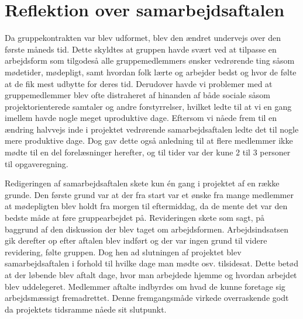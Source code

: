 \section{Reflektion over samarbejdsaftalen}\label{Reflektion-over-samarbejdsaftale}
Da gruppekontrakten var blev udformet, blev den ændret undervejs over den første måneds tid. Dette skyldtes at gruppen havde svært ved at tilpasse en arbejdsform som tilgodeså alle gruppemedlemmers ønsker vedrørende ting såsom mødetider, mødepligt, samt hvordan folk lærte og arbejder bedst og hvor de følte at de fik mest udbytte for deres tid. Derudover havde vi problemer med at gruppemedlemmer blev ofte distraheret af hinanden af både sociale såsom projektorienterede samtaler og andre forstyrrelser, hvilket ledte til at vi en gang imellem havde nogle meget uproduktive dage. Eftersom vi nåede frem til en ændring halvvejs inde i projektet vedrørende samarbejdsaftalen ledte det til nogle mere produktive dage. Dog gav dette også anledning til at flere medlemmer ikke mødte til en del forelæsninger herefter, og til tider var der kune 2 til 3 personer til opgaveregning.

\vspace{5mm}

 Redigeringen af samarbejdsaftalen skete kun én gang i projektet af en række grunde. Den første grund var at der fra start var et ønske fra mange medlemmer at mødepligten blev holdt fra morgen til eftermiddag, da de mente det var den bedste måde at føre gruppearbejdet på. Revideringen skete som sagt, på baggrund af den diskussion der blev taget om arbejdsformen. Arbejdsindsatsen gik derefter op efter aftalen blev indført og der var ingen grund til videre revidering, følte gruppen. Dog hen ad slutningen af projektet blev samarbejdsaftalen i forhold til hvilke dage man mødte osv. tilsidesat. Dette betød at der løbende blev aftalt dage, hvor man arbejdede hjemme og hvordan arbejdet blev uddelegeret. Medlemmer aftalte indbyrdes om hvad de kunne foretage sig arbejdsmæssigt fremadrettet. Denne fremgangsmåde virkede overraskende godt da projektets tidsramme nåede sit slutpunkt.